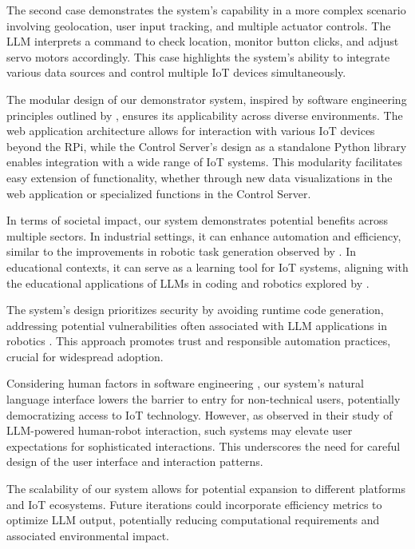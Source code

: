 \documentclass{ieeeaccess}
\begin{document}
The second case demonstrates the system's capability in a more complex scenario involving geolocation, user input tracking, and multiple actuator controls. The LLM interprets a command to check location, monitor button clicks, and adjust servo motors accordingly. This case highlights the system's ability to integrate various data sources and control multiple IoT devices simultaneously.

The modular design of our demonstrator system, inspired by software engineering principles outlined by \citet{taylor2010software}, ensures its applicability across diverse environments. The web application architecture allows for interaction with various IoT devices beyond the RPi, while the Control Server's design as a standalone Python library enables integration with a wide range of IoT systems. This modularity facilitates easy extension of functionality, whether through new data visualizations in the web application or specialized functions in the Control Server.

In terms of societal impact, our system demonstrates potential benefits across multiple sectors. In industrial settings, it can enhance automation and efficiency, similar to the improvements in robotic task generation observed by \citet{wang2024gensimgeneratingroboticsimulation}. In educational contexts, it can serve as a learning tool for IoT systems, aligning with the educational applications of LLMs in coding and robotics explored by \citet{shu2024llmscodingroboticseducation}.

The system's design prioritizes security by avoiding runtime code generation, addressing potential vulnerabilities often associated with LLM applications in robotics \cite{wang2024gensimgeneratingroboticsimulation}. This approach promotes trust and responsible automation practices, crucial for widespread adoption.

Considering human factors in software engineering \cite{1553657}, our system's natural language interface lowers the barrier to entry for non-technical users, potentially democratizing access to IoT technology. However, as \citet{10.1145/3610977.3634966} observed in their study of LLM-powered human-robot interaction, such systems may elevate user expectations for sophisticated interactions. This underscores the need for careful design of the user interface and interaction patterns.

The scalability of our system allows for potential expansion to different platforms and IoT ecosystems. Future iterations could incorporate efficiency metrics to optimize LLM output, potentially reducing computational requirements and associated environmental impact.
\end{document}
